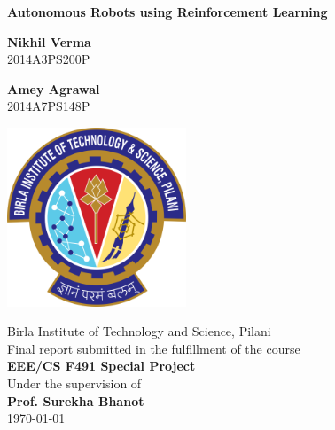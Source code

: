 \documentclass[12pt]{extreport}
\begin{document}
\begin{titlepage}
 \begin{center}

  \vspace*{1cm}

  \begin{huge}
   \textbf{Autonomous Robots using Reinforcement Learning}
  \end{huge}

  \vspace{0.5cm}

  \begin{multicols}{2}
   \textbf{Nikhil Verma}\\
   2014A3PS200P

   \textbf{Amey Agrawal}\\
   2014A7PS148P
  \end{multicols}

  \vspace{2cm}

  \includegraphics[width=0.4\textwidth]{logo}

  \vspace{2cm}

  Birla Institute of Technology and Science, Pilani\\
  \vspace{0.5cm}
  Final report submitted in the fulfillment of the course\\
  \textbf{EEE/CS F491 Special Project}\\
  Under the supervision of\\
  \textbf{Prof. Surekha Bhanot}\\
  \vspace{0.5cm}
  \today


 \end{center}
\end{titlepage}
\end{document}
